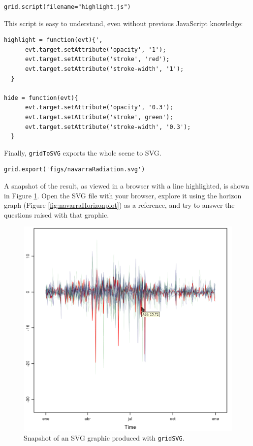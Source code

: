 
\lstset{language=r,label= ,caption= ,captionpos=b,numbers=none}
\begin{lstlisting}
grid.script(filename="highlight.js")
\end{lstlisting}

This script is easy to understand, even without previous
JavaScript knowledge:
\begin{verbatim}
highlight = function(evt){',
      evt.target.setAttribute('opacity', '1');
      evt.target.setAttribute('stroke', 'red');
      evt.target.setAttribute('stroke-width', '1');
  }
  
hide = function(evt){
      evt.target.setAttribute('opacity', '0.3');
      evt.target.setAttribute('stroke', green');
      evt.target.setAttribute('stroke-width', '0.3');
  }
\end{verbatim}

Finally, \texttt{gridToSVG} exports the whole scene to SVG. 


\lstset{language=r,label= ,caption= ,captionpos=b,numbers=none}
\begin{lstlisting}
grid.export('figs/navarraRadiation.svg')
\end{lstlisting}

A snapshot of the result, as viewed in a browser with a line
highlighted, is shown in Figure \ref{fig:navarraSVG}. Open the SVG
file with your browser, explore it using the horizon graph (Figure
\ref{fig:navarraHorizonplot}) as a reference, and try to answer the
questions raised with that graphic.

\begin{figure}[htbp]
\centering
\includegraphics[width=.9\linewidth]{figs/navarraSVG_captura.png}
\caption{Snapshot of an SVG graphic produced with \texttt{gridSVG}. \label{fig:navarraSVG}}
\end{figure}


